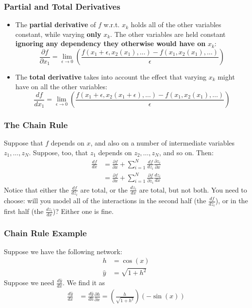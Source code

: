 \documentclass{beamer}
\begin{document}
\begin{frame}
  \frametitle{Partial and Total Derivatives}

  \begin{itemize}
  \item
    The {\bf partial derivative} of $f$ w.r.t. $x_k$ holds all of the
    other variables constant, while varying {\bf only} $x_k$.  The
    other variables are held constant {\bf ignoring any dependency
      they otherwise would have on} $x_k$:
    \begin{displaymath}
    \frac{\partial f}{\partial x_1} = \lim_{\epsilon\rightarrow 0}\left(
    \frac{f(x_1+\epsilon,x_{2}(x_1),\ldots)-
      f(x_1,x_{2}(x_1),\ldots)}{\epsilon}
    \right)
    \end{displaymath}
  \item
    The {\bf total derivative} takes into account the effect that
    varying $x_k$ might have on all the other variables:
    \begin{displaymath}
    \frac{d f}{d x_1} = \lim_{\epsilon\rightarrow 0}\left(
    \frac{f(x_1+\epsilon,x_{2}(x_1+\epsilon),\ldots)-
      f(x_1,x_{2}(x_1),\ldots)}{\epsilon}
    \right)
    \end{displaymath}
  \end{itemize}
\end{frame}

\begin{frame}
  \frametitle{The Chain Rule}

  Suppose that $f$ depends on $x$, and also on a number of
  intermediate variables $z_1,\ldots,z_N$.  Suppose, too, that $z_1$
  depends on $z_2,\ldots,z_N$, and so on.  Then:
  \begin{align*}
    \frac{df}{dx}
    &= \frac{\partial f}{\partial x}+
    \sum_{i=1}^N \frac{df}{dz_i}\frac{\partial z_i}{\partial x}\\
    &= \frac{\partial f}{\partial x}+
    \sum_{i=1}^N \frac{\partial f}{\partial z_i}\frac{dz_i}{dx}
  \end{align*}
  Notice that either the $\frac{df}{dz_i}$ are total, or the
  $\frac{dz_i}{dx}$ are total, but not both.  You need to choose: will
  you model all of the interactions in the second half (the
  $\frac{df}{dz_i}$), or in the first half (the $\frac{dz_i}{dx}$)?
  Either one is fine.
\end{frame}

\begin{frame}
  \frametitle{Chain Rule Example}

  Suppose we have the following network:
  \begin{align*}
    h &= \cos(x)\\
    \hat{y} &= \sqrt{1+h^2}
  \end{align*}
  Suppose we need $\frac{d\hat{y}}{dx}$.  We find it as
  \begin{align*}
    \frac{d\hat{y}}{dx} &= \frac{d\hat{y}}{dh}\frac{\partial h}{\partial x}
    = \left(\frac{h}{\sqrt{1+h^2}}\right)\left(-\sin(x)\right)
  \end{align*}    
\end{frame}
\end{document}
